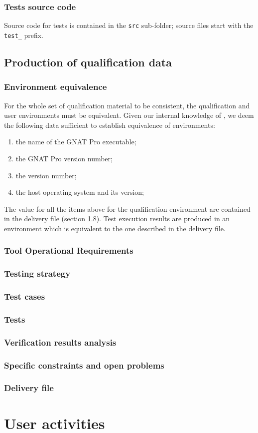 \documentclass {report}
\begin{document}
\subsection{Tests source code}
Source code for tests is contained in the \texttt{src} sub-folder; source files start with the \texttt{test\_} prefix. 

\section{Production of qualification data}

\subsection{Environment equivalence}
For the whole set of qualification material to be consistent, the qualification and user environments must be equivalent. Given our internal knowledge of \xcov, we deem the following data sufficient to establish equivalence of environments:
\begin{enumerate}
\item the name of the GNAT Pro executable;
\item the GNAT Pro version number;
\item the \xcov version number;
\item the host operating system and its version;
\end{enumerate}
The value for all the items above for the qualification environment are contained in the delivery file (section \ref{sec:delivery}). Test execution results are produced in an environment which is equivalent to the one described in the delivery file. 

\subsection{Tool Operational Requirements}
\subsection{Testing strategy}
\subsection{Test cases}
\subsection{Tests}
\subsection{Verification results analysis}
\subsection{Specific constraints and open problems}
\label{sec:constr-problems}
\subsection{Delivery file}
\label{sec:delivery}

\chapter{User activities}
\label{sec:user-act}
\end{document}
